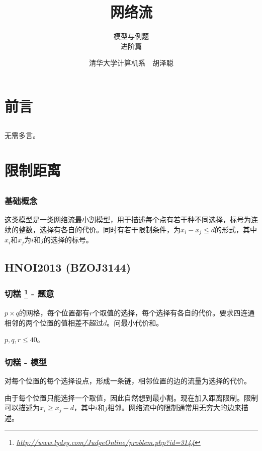 \documentclass[11pt,dvipsnames,table]{beamer}
\newcommand{\hlink}[1]{
	\footnote{\fontsize{6pt}{\baselineskip}\href{#1}{\textsl{\underline{#1}}}}
}
\begin{document}
\title[网络流]{\fontsize{24pt}{\baselineskip}网络流}
\subtitle[模型与例题]{\fontsize{16pt}{\baselineskip}模型与例题\\ 进阶篇}
\author{清华大学计算机系~~胡泽聪}
\date{}

\maketitle

{\fontsize{9pt}{\baselineskip}

\section{前言}
\subsection{}
\begin{frame}
	无需多言。
\end{frame}

\section[Model VII]{限制距离}
\subsection{}
\begin{frame}
	\frametitle{基础概念}
	这类模型是一类网络流最小割模型，用于描述每个点有若干种不同选择，标号为连续的整数，选择有各自的代价。同时有若干限制条件，为$x_i-x_j\leq d$的形式，其中$x_i$和$x_j$为$i$和$j$的选择的标号。
\end{frame}

\subsection{HNOI2013 (BZOJ3144)}
\begin{frame}
	\frametitle{切糕\hlink{http://www.lydsy.com/JudgeOnline/problem.php?id=3144} - 题意}
	$p\times q$的网格，每个位置都有$r$个取值的选择，每个选择有各自的代价。要求四连通相邻的两个位置的值相差不超过$d$。问最小代价和。
	
	$p,q,r\leq 40$。
\end{frame}
\begin{frame}
	\frametitle{切糕 - 模型}
	对每个位置的每个选择设点，形成一条链，相邻位置的边的流量为选择的代价。\pause
	
	由于每个位置只能选择一个取值，因此自然想到最小割。现在加入距离限制。限制可以描述为$x_i\geq x_j-d$，其中$i$和$j$相邻。网络流中的限制通常用无穷大的边来描述。\pause
	

\end{frame}}
\end{document}

